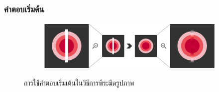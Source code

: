 \documentclass[xcolor=dvipsnames, xetex,serif]{beamer}
\numberwithin{equation}{section}
\begin{document}
	\begin{frame}
		\frametitle{คำตอบเริ่มต้น}
		\begin{figure}[H]
			\centering
			\begin{subfigure}{0.8\linewidth}
				\centering
				\includegraphics[width=1\linewidth]{images/image_inital_solution.png}
			\end{subfigure}
			\caption{การใช้คำตอบเริ่มเต้นในวิธีการพีระมิดรูปภาพ}
		\end{figure}
	\end{frame}
\end{document}

